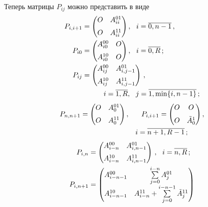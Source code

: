 \begin{multicols}{2}
Теперь матрицы $P_{ij}$ можно представить в виде
\begin{align}
\label{p_ij}
P_{i,i+1}&=
\begin{pmatrix}
O & A^{01}_{ii}\\[6pt]
O & A^{11}_{ii}\\
\end{pmatrix},\ \ i=\overline{0,n-1}\,,
\\
P_{i0}&=
\begin{pmatrix}
A^{00}_{i0} & O \\[6pt]
A^{10}_{i0} & O \\
\end{pmatrix}, \ \ i=\overline{0,R}\,;\\
P_{ij}&=
\begin{pmatrix}
A^{00}_{ij} & A^{01}_{i,j-1} \\[6pt]
A^{10}_{ij} & A^{11}_{i,j-1} \\
\end{pmatrix}\,,\notag \\
&\ \ \ \ \ \ \ \ \ i=\overline{1,R}, \ \ j=\overline{1,\min\{i,n-1\}}\,;
\end{align}
\begin{gather}
P_{n,n+1}=
\begin{pmatrix}
O & A^{01}_{0}\\[6pt]
O & A^{11}_{0}\\
\end{pmatrix}, \ \ \ \ \
P_{i,i+1}=
\begin{pmatrix}
O & O\\[6pt]
O & \Tilde A_0^1 \\
\end{pmatrix}, \notag\\
\ \ \ \  \  \ \ \ \hspace*{20mm} i=\overline{n+1,R-1}\,;
\end{gather}
\begin{align}
P_{i,n}& =
\begin{pmatrix}
A^{00}_{i-n} & A^{01}_{i,n-1} \\[6pt]
A^{10}_{i-n} & A^{11}_{i,n-1} \\
\end{pmatrix}\,, \ \ i=\overline{n,R}\,;\\
P_{i,n+1}&=
\begin{pmatrix}
A^{00}_{i-n-1} & \sum\limits_{j=0}^{i-n} A^{01}_{j}\\[6pt]
A^{10}_{i-n-1} & A^{11}_{i-n} + \sum\limits_{j=0}^{i-n-1} \Tilde A^{11}_{j}\\

\end{pmatrix}
\end{align}
\end{multicols}
